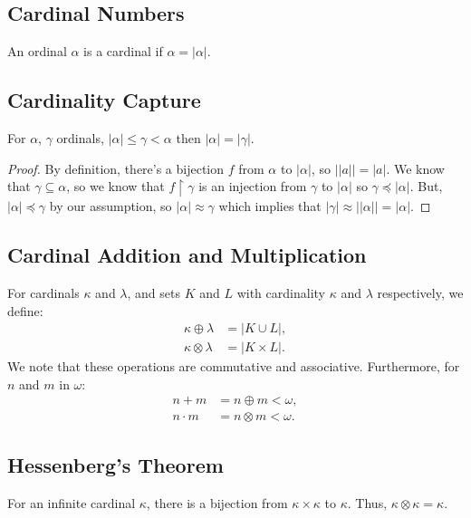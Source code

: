 \subsection{Cardinal Numbers}

An ordinal $\alpha$ is a cardinal if $\alpha = |\alpha|$.

\subsection{Cardinality Capture}

For $\alpha$, $\gamma$ ordinals,
$|\alpha| \leq \gamma < \alpha$ then $|\alpha| = |\gamma|$.

\begin{proof}
    By definition, there's a bijection $f$ from $\alpha$
    to $|\alpha|$, so $||a|| = |a|$. We know that $\gamma
    \subseteq \alpha$, so we know that
    $f \upharpoonright \gamma$ is an injection from $\gamma$ to 
    $|\alpha|$ so $\gamma \preceq |\alpha|$. But, 
    $|\alpha| \preceq \gamma$ by our assumption,
    so $|\alpha| \approx \gamma$ which implies that
    $|\gamma| \approx ||\alpha|| = |\alpha|$.
\end{proof}

\subsection{Cardinal Addition and Multiplication}

For cardinals $\kappa$ and $\lambda$, and sets $K$ and $L$ with cardinality
$\kappa$ and $\lambda$ respectively, we define: \begin{align*}
    \kappa \oplus \lambda &= |K \cup L|, \tag{for $K$, $L$ disjoint} \\
    \kappa \otimes \lambda &= |K \times L|.
\end{align*} We note that these operations are commutative and associative.
Furthermore, for $n$ and $m$ in $\omega$: \begin{align*}
    n + m &= n \oplus m < \omega, \\
    n \cdot m &= n \otimes m < \omega.
\end{align*}

\subsection{Hessenberg's Theorem}

For an infinite cardinal $\kappa$, there is a bijection from $\kappa \times \kappa$
to $\kappa$. Thus, $\kappa \otimes \kappa = \kappa$.

